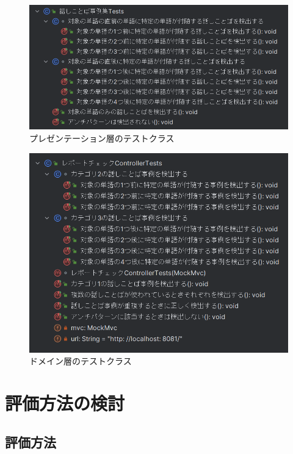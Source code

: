 \documentclass[12pt, a4paper]{jreport}
\begin{document}
\begin{figure}[H]
\centering
\includegraphics[width=1\linewidth]{image/presenTest.png}
\caption{プレゼンテーション層のテストクラス}
\label{fig:enter-label}
\end{figure}
\begin{figure}[H]
\centering
\includegraphics[width=1\linewidth]{image/domainTest.png}
\caption{ドメイン層のテストクラス}
\label{fig:enter-label}
\end{figure}
\chapter{評価方法の検討}
\section{評価方法}
\end{document}
